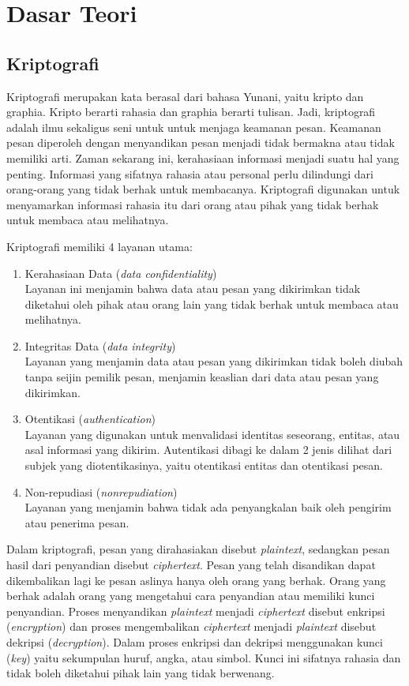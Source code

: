 \chapter{Dasar Teori}
\label{chap:dasar teori}

\section{Kriptografi}
Kriptografi merupakan kata berasal dari bahasa Yunani, yaitu kripto dan graphia. Kripto berarti rahasia dan graphia berarti tulisan. Jadi, kriptografi adalah ilmu sekaligus seni untuk untuk menjaga keamanan pesan. Keamanan pesan diperoleh dengan menyandikan pesan menjadi tidak bermakna atau tidak memiliki arti. Zaman sekarang ini, kerahasiaan informasi menjadi suatu hal yang penting. Informasi yang sifatnya rahasia atau personal perlu dilindungi dari orang-orang yang tidak berhak untuk membacanya. Kriptografi digunakan untuk menyamarkan informasi rahasia itu dari orang atau pihak yang tidak berhak untuk membaca atau melihatnya.

Kriptografi memiliki 4 layanan utama:
\begin{enumerate}
	\item Kerahasiaan Data (\textit{data confidentiality})\\
	Layanan ini menjamin bahwa data atau pesan yang dikirimkan tidak diketahui oleh pihak atau orang lain yang tidak berhak untuk membaca atau melihatnya.
	\item Integritas Data (\textit{data integrity})\\
	Layanan yang menjamin data atau pesan yang dikirimkan tidak boleh diubah tanpa seijin pemilik pesan, menjamin keaslian dari data atau pesan yang dikirimkan.
	\item Otentikasi (\textit{authentication})\\
	Layanan yang digunakan untuk menvalidasi identitas seseorang, entitas, atau  asal informasi yang dikirim. Autentikasi dibagi ke dalam 2 jenis dilihat dari subjek yang diotentikasinya, yaitu otentikasi entitas dan otentikasi pesan.
	\item Non-repudiasi (\textit{nonrepudiation})\\
	Layanan yang menjamin bahwa tidak ada penyangkalan baik oleh pengirim atau penerima pesan.
\end{enumerate}

Dalam kriptografi, pesan yang dirahasiakan disebut \textit{plaintext}, sedangkan pesan hasil dari penyandian disebut \textit{ciphertext}. Pesan yang telah disandikan dapat dikembalikan lagi ke pesan aslinya hanya oleh orang yang berhak. Orang yang berhak adalah orang yang mengetahui cara penyandian atau memiliki kunci penyandian. Proses menyandikan \textit{plaintext} menjadi \textit{ciphertext} disebut enkripsi (\textit{encryption}) dan proses mengembalikan \textit{ciphertext} menjadi \textit{plaintext} disebut dekripsi (\textit{decryption}). Dalam proses enkripsi dan dekripsi menggunakan kunci (\textit{key}) yaitu sekumpulan huruf, angka, atau simbol. Kunci ini sifatnya rahasia dan tidak boleh diketahui pihak lain yang tidak berwenang.

